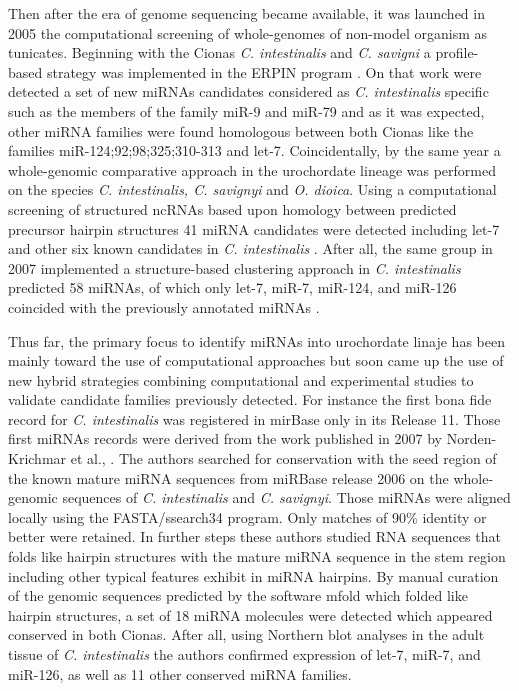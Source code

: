 \documentclass[graybox]{svmult}
\begin{document}
Then after the era of genome sequencing became available, it was launched in 2005 the computational screening of whole-genomes of non-model organism as tunicates. Beginning with the Cionas \textit{C. intestinalis} and \textit{C. savigni} a profile-based strategy was implemented in the ERPIN program \cite{Legendre2005}. On that work were detected a set of new miRNAs candidates considered as \textit{C. intestinalis} specific such as the members of the family miR-9 and miR-79 and as it was expected, other miRNA families were found homologous between both Cionas like the families miR-124;92;98;325;310-313 and let-7. Coincidentally, by the same year a whole-genomic comparative approach in the urochordate lineage was performed on the species \textit{C. intestinalis, C. savignyi} and \textit{O. dioica}. Using a computational screening of structured ncRNAs based upon homology between predicted precursor hairpin structures  41 miRNA candidates were detected including let-7 and other six known candidates in \textit{C. intestinalis} \cite{Missal2005}. After all, the same group in 2007 implemented a structure-based clustering approach in \textit{C. intestinalis} predicted 58 miRNAs, of which only let-7, miR-7, miR-124, and miR-126 coincided with the previously annotated miRNAs \cite{Will2007}. 

Thus far, the primary focus to identify miRNAs into urochordate linaje has been mainly toward the use of computational approaches but soon came up the use of new hybrid strategies combining computational and experimental studies to validate candidate families previously detected. For instance the first bona fide record for \textit{C. intestinalis} was registered in mirBase only in its Release 11. Those first miRNAs records were derived from the work published in 2007 by Norden-Krichmar et al., \cite{Norden-Krichmar2007}. The authors searched for conservation with the seed region of the known mature miRNA sequences from miRBase release 2006 on the whole-genomic sequences of \textit{C. intestinalis} and \textit{C. savignyi}. Those miRNAs were aligned locally using the FASTA/ssearch34 program. Only matches of 90\% identity or better were retained. In further steps these authors studied RNA sequences that folds like hairpin structures with the mature miRNA sequence in the stem region including other typical features exhibit in miRNA hairpins. By manual curation of the genomic sequences predicted by the software mfold which folded like hairpin structures, a set of 18 miRNA molecules were detected which appeared conserved in both Cionas. After all, using  Northern blot analyses in the adult tissue of \textit{C. intestinalis} the authors confirmed expression of  let-7, miR-7, and miR-126, as well as 11 other conserved miRNA families.
\end{document}
